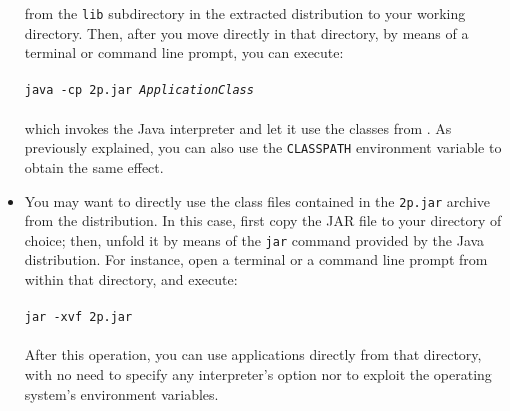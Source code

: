 \begin{itemize}
  from the \verb|lib| subdirectory in the extracted distribution to
  your working directory. Then, after you move directly in that
  directory, by means of a terminal or command line prompt, you can
  execute:\\\\
%
\texttt{java -cp 2p.jar \textit{ApplicationClass}}\\\\
%
which invokes the Java interpreter and let it use the classes from
\tuprolog{}. As previously explained, you can also use the
\verb|CLASSPATH| environment variable to obtain the same effect.
%
\item You may want to directly use the class files contained in the
  \verb|2p.jar| archive from the \tuprolog{} distribution. In this
  case, first copy the JAR file to your directory of choice; then,
  unfold it by means of the \verb|jar| command provided by the Java
  distribution. For instance, open a terminal or a command line
  prompt from within that directory, and execute:\\\\
%
\texttt{jar -xvf 2p.jar}\\\\
%
After this operation, you can use \tuprolog{} applications directly
from that directory, with no need to specify any interpreter's option
nor to exploit the operating system's environment variables.
\end{itemize}
